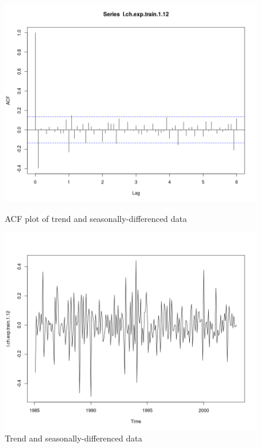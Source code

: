 \documentclass[]{article}
\begin{document}
\begin{figure}[!ht]
\centering
\begin{minipage}{.5\textwidth}
\centering
\includegraphics[width=\linewidth]{acf1.12_sarima}
\caption{ACF plot of trend and seasonally-differenced data}
\label{acf1.12_sarima}
\end{minipage}%
\begin{minipage}{.5\textwidth}
\centering
\includegraphics[width=\linewidth]{exports_1.12}
\caption{Trend and seasonally-differenced data}
\label{exports_1.12}
\end{minipage}
\end{figure}
\end{document}
